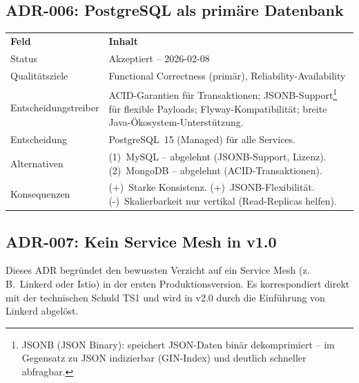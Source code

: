\subsection{ADR-006: PostgreSQL als primäre Datenbank}

\begin{tabularx}{\textwidth}{L{3.5cm} X}
  \color{white}\textbf{Feld} & \color{white}\textbf{Inhalt} \\
  Status & Akzeptiert -- 2026-02-08 \\
  Qualitätsziele & Functional Correctness (primär), Reliability-Availability \\
  Entscheidungstreiber & ACID-Garantien für Transaktionen; JSONB-Support\footnote{JSONB
    (JSON Binary): speichert JSON-Daten binär dekomprimiert -- im Gegensatz zu JSON indizierbar
    (GIN-Index) und deutlich schneller abfragbar.} für flexible Payloads;
  Flyway-Kompatibilität; breite Java-Ökosystem-Unterstützung. \\
  Entscheidung & PostgreSQL~15 (Managed) für alle Services. \\
  Alternativen & (1)~MySQL -- abgelehnt (JSONB-Support, Lizenz). (2)~MongoDB -- abgelehnt (ACID-Transaktionen). \\
  Konsequenzen & (+)~Starke Konsistenz. (+)~JSONB-Flexibilität. (-)~Skalierbarkeit nur vertikal (Read-Replicas helfen). \\
\end{tabularx}

\subsection{ADR-007: Kein Service Mesh in v1.0}

Dieses ADR begründet den bewussten Verzicht auf ein Service Mesh (z.\,B.\ Linkerd oder Istio)
in der ersten Produktionsversion. Es korrespondiert direkt mit der technischen Schuld TS1 und
wird in v2.0 durch die Einführung von Linkerd abgelöst.


